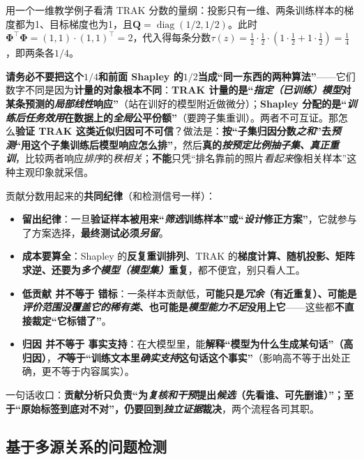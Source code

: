 用一个一维教学例子看清 TRAK 分数的量纲：投影只有一维、两条训练样本的梯度都为1、目标梯度也为1，且$\bm Q=\operatorname{diag}(1/2,1/2)$。此时$\bm{\Phi}^{\top}\bm{\Phi}=(1,1)\cdot(1,1)^\top=2$，代入得每条分数$\tau(z)=\tfrac12\cdot\tfrac12\cdot(1\cdot\tfrac12+1\cdot\tfrac12)=\tfrac14$，即两条各$1/4$。

\textbf{请务必不要把这个$1/4$和前面 Shapley 的$1/2$当成“同一东西的两种算法”}——它们数字不同是因为\textbf{计量的对象根本不同}：\textbf{TRAK 计量的是“\emph{指定（已训练）模型}对某条预测的\emph{局部线性}响应”}（站在训好的模型附近做微分）；\textbf{Shapley 分配的是“\emph{训练后任务效用}在数据上的\emph{全局}公平份额”}（要跨子集重训）。两者不可互证。那怎么\textbf{验证 TRAK 这类近似归因可不可信}？做法是：\textbf{按“子集归因分数\emph{之和}”去\emph{预测}“用这个子集训练后模型响应怎么排”}，然后\textbf{真的\emph{按预定比例抽子集、\emph{真正}重训}}，比较两者响应\emph{排序}的\emph{秩相关}；\textbf{不能}只凭“排名靠前的照片\emph{看起来}像相关样本”这种主观印象就采信。

贡献分数用起来的\textbf{共同纪律}（和检测信号一样）：
\begin{itemize}\item \textbf{留出纪律}：一旦\textbf{验证样本被用来“\emph{筛选}训练样本”或“\emph{设计}修正方案”}，它就参与了方案选择，\textbf{最终测试必须\emph{另留}}。\item \textbf{成本要算全}：Shapley 的\textbf{反复重训排列}、TRAK 的\textbf{梯度计算、随机投影、矩阵求逆、还要为\emph{多个模型（模型集）}重复}，都不便宜，别只看人工。\item \textbf{低贡献 并不等于 错标}：一条样本贡献低，\textbf{可能只是\emph{冗余}（有近重复）、可能是\emph{评价范围没覆盖它的稀有类}、也可能是\emph{模型能力不足}没用上它}——这些都\textbf{不直接裁定“它标错了”}。\item \textbf{归因 并不等于 事实支持}：在大模型里，能\textbf{解释“模型为什么生成某句话”（高归因）}，\textbf{\emph{不}等于“训练文本里\emph{确实支持}这句话这个事实”}（影响高不等于出处正确，更不等于内容属实）。\end{itemize}
一句话收口：\textbf{贡献分析只负责“为\emph{复核和干预}提出\emph{候选}（先看谁、可先删谁）”；至于“原始标签到底对不对”，\textbf{仍要回到\emph{独立证据}裁决}}，两个流程各司其职。

\subsection{基于多源关系的问题检测}
\label{sec:knowledge-quality-assessment-correction-multisource-detection}

